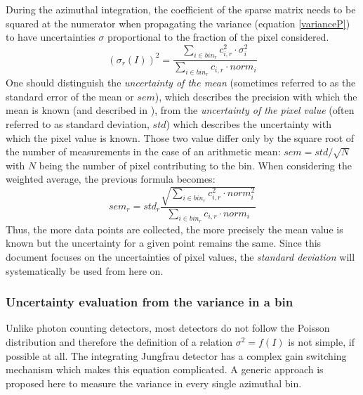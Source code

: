\documentclass[preprint]{iucr}              %
\begin{document}
During the azimuthal integration, the coefficient of the sparse matrix needs to be squared at the numerator when propagating the variance (equation \ref{varianceP}) to have uncertainties $\sigma$ proportional to the fraction of the pixel considered.
\begin{equation}
\label{varianceP}
(\sigma_{r}(I))^2 = \frac{\sum\limits_{i \in bin_r} c_{i,r}^2 \cdot \sigma_i^2}
                  {\sum\limits_{i \in bin_r} c_{i,r} \cdot norm_i} 
\end{equation}
One should distinguish the \textit{uncertainty of the mean} (sometimes referred to as the standard error of the mean or $sem$), 
which describes the precision with which the mean is known (and described in ),
from the \textit{uncertainty of the pixel value} (often referred to as standard deviation, $std$) which describes the uncertainty with which the pixel value is known. 
Those two value differ only by the square root of the number of measurements in the case of an arithmetic mean: $sem = std/\sqrt{N}$ with $N$ being the number of pixel contributing to the bin.
When considering the weighted average, the previous formula becomes:
\begin{equation}
\label{sem}
sem_r = std_r \frac{\sqrt{\sum\limits_{i \in bin_r} c_{i,r}^2 \cdot norm_i^2}}{\sum\limits_{i \in bin_r} c_{i,r} \cdot norm_i}
\end{equation}
Thus, the more data points are collected, the more precisely the mean value is known but the uncertainty for a given point remains the same.
Since this document focuses on the uncertainties of pixel values, the \textit{standard deviation} will systematically be used from here on.  

\subsubsection{Uncertainty evaluation from the variance in a bin}

Unlike photon counting detectors, most detectors do not follow the Poisson distribution and therefore the definition of a relation $\sigma^2 = f(I)$ is not simple, if possible at all. 
The integrating Jungfrau detector has a complex gain switching mechanism \cite{jungfrau_PSI} which makes this equation complicated.
A generic approach is proposed here to measure the variance in every single azimuthal bin.
\end{document}

